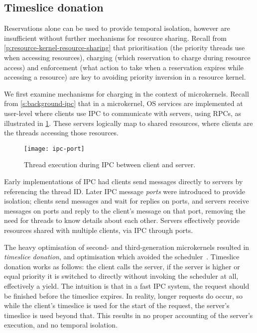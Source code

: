 \subsection{Timeslice donation}
\label{sec:os-timeslice-donation}

Reservations alone can be used to provide temporal isolation, however are insufficient without
further mechanisms for resource sharing. Recall from \cref{p:resource-kernel-resource-sharing} that
prioritisation (the priority threads use when accessing resources), charging (which reservation to
charge during resource access) and enforcement (what action to take when a reservation expires while
accessing a resource) are key to avoiding priority inversion in a resource kernel.

We first examine mechanisms for charging in the context of microkernels.
Recall from \cref{s:background-ipc} that in a microkernel, \gls{OS} services are implemented at
user-level where clients use \gls{IPC} to communicate with servers, using \glspl{RPC}, as
illustrated in \cref{f:os-ipc}. These servers logically map to shared resources, where clients are
the threads accessing those resources.

\begin{figure}
    \centering
    \texttt{[image: ipc-port]}
    \caption[Thread execution during IPC.]{Thread execution during IPC between client and server.}
    \label{f:os-ipc}
\end{figure}

Early implementations of IPC had clients send messages directly to servers by referencing the
thread ID. Later IPC message \emph{ports} were introduced to provide isolation; clients send
messages and wait for replies on ports, and servers receive messages on ports and reply to the
client's message on that port, removing the need for threads to know details about each other. 
Servers effectively provide resources shared with multiple clients, via IPC through ports. 

The heavy optimisation of second- and third-generation microkernels resulted in \emph{timeslice
donation}, and optimisation which avoided the scheduler~\citep{Heiser_Elphinstone_16}. 
Timeslice donation works as follows: the client calls the server, if the server is higher or equal
priority it is switched to directly without invoking the scheduler at all, effectively a yield.
The intuition is that in
a fast IPC system, the request should be finished before the timeslice expires. In reality, longer
requests do occur, so while the client's timeslice is used for the start of the request, the server's
timeslice is used beyond that. This results in no
proper accounting of the server's execution, and no temporal isolation.


